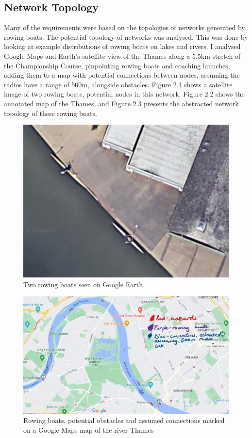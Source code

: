 \documentclass[12pt,a4paper]{report}
\begin{document}
\subsection{Network Topology}
Many of the requirements were based on the topologies of networks generated by rowing boats. The potential topology of networks was analysed. This was done by looking at example distributions of rowing boats on lakes and rivers. I analysed Google Maps and Earth's satellite view of the Thames along a 5.5km stretch of the Championship Course, pinpointing rowing boats and coaching launches, adding them to a map with potential connections between nodes, assuming the radios have a range of 500m, alongside obstacles. Figure 2.1 shows a satellite image of two rowing boats, potential nodes in this network. Figure 2.2 shows the annotated map of the Thames, and Figure 2.3 presents the abstracted network topology of these rowing boats.
\begin{figure}[h]
\begin{center}
\includegraphics[scale=0.5]{earthSculler.jpg}
\end{center}
\caption{Two rowing boats seen on Google Earth \cite{earth}}
\end{figure}
\begin{figure}[h]
\begin{center}
\includegraphics[scale=0.4]{mapsmarked.jpg}
\end{center}
\caption{Rowing boats, potential obstacles and assumed connections marked on a Google Maps map of the river Thames \cite{googlemapsgeneral}}
\end{figure}
\end{document}
